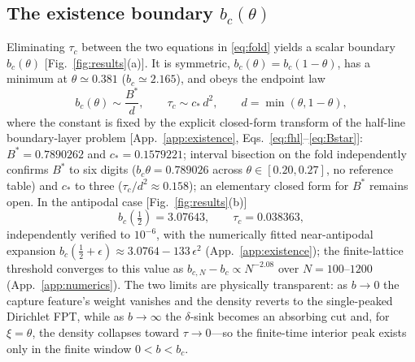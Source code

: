 \documentclass[reprint,amsmath,amssymb,aps,prresearch,longbibliography]{revtex4-2}
\begin{document}
\subsection{The existence boundary $b_c(\theta)$}\label{sec:existB}
Eliminating $\tau_c$ between the two equations in \eqref{eq:fold} yields a scalar boundary $b_c(\theta)$
[Fig.~\ref{fig:results}(a)]. It is symmetric, $b_c(\theta)=b_c(1-\theta)$, has a minimum at
$\theta\simeq0.381$ ($b_c\simeq2.165$), and obeys the endpoint law
\begin{equation}
b_c(\theta)\sim\frac{B^*}{d},\qquad \tau_c\sim c_*\,d^2,\qquad d=\min(\theta,1-\theta),
\label{eq:endpoint}
\end{equation}
where the constant is fixed by the explicit closed-form transform of the half-line boundary-layer
problem [App.~\ref{app:existence}, Eqs.~\eqref{eq:fhl}--\eqref{eq:Bstar}]: $B^*=0.7890262$ and
$c_*=0.1579221$; interval bisection on the fold independently confirms $B^*$ to six digits
($b_c\theta=0.789026$ across $\theta\in[0.20,0.27]$, no reference table) and $c_*$ to three
($\tau_c/d^2\approx0.158$); an elementary closed form
for $B^*$ remains open. In the antipodal case [Fig.~\ref{fig:results}(b)]
\begin{equation}
b_c(\tfrac12)=3.07643,\qquad \tau_c=0.038363,
\label{eq:antip}
\end{equation}
independently verified to $10^{-6}$, with the numerically fitted near-antipodal expansion
$b_c(\tfrac12+\epsilon)\approx3.0764-133\,\epsilon^2$ (App.~\ref{app:existence}); the finite-lattice
threshold converges to this value as $b_{c,N}-b_c\propto N^{-2.08}$ over $N=100$--$1200$
(App.~\ref{app:numerics}). The two limits are physically transparent: as
$b\to0$ the capture feature's weight vanishes and the density reverts to the single-peaked Dirichlet FPT,
while as $b\to\infty$ the $\delta$-sink becomes an absorbing cut and, for $\xi=\theta$, the density
collapses toward $\tau\to0$---so the finite-time interior peak exists only in the finite window
$0<b<b_c$.
\end{document}
